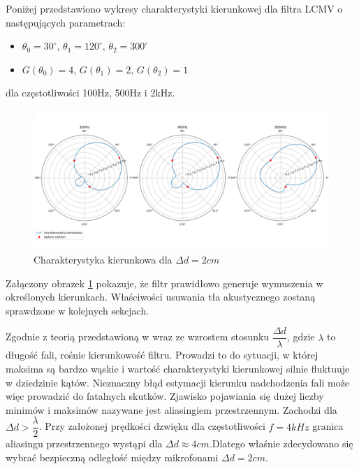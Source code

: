 Poniżej przedstawiono wykresy charakterystyki kierunkowej dla filtra LCMV o następujących parametrach:

\begin{itemize}
    \item $\theta_{0}=30^{\circ}, \,
    \theta_{1}=120^{\circ}, \,
    \theta_{2}=300^{\circ}$
    \item $G(\theta_{0})=4, \,
    G(\theta_{1})=2, \,
    G(\theta_{2})=1$
\end{itemize}
\noindent dla częstotliwości 100Hz, 500Hz i 2kHz.

\begin{figure}[h!]
    \centering
    \includegraphics[width=\textwidth]{Images/directivity0.02m.png}
    \caption{Charakterystyka kierunkowa dla $\Delta d = 2cm$}
    \label{fig:directivity0.02}
\end{figure}

\noindent Załączony obrazek \ref{fig:directivity0.02} pokazuje, że filtr prawidłowo generuje wymuszenia w określonych kierunkach. Właściwości usuwania tła akustycznego zostaną sprawdzone w kolejnych sekcjach.

\noindent Zgodnie z teorią przedstawioną w \cite{mccowan2001} wraz ze wzrostem stosunku $\dfrac{\Delta d}{\lambda}$, gdzie $\lambda$ to długość fali, rośnie kierunkowość filtru. Prowadzi to do sytuacji, w której maksima są bardzo wąskie i wartość charakterystyki kierunkowej silnie fluktuuje w dziedzinie kątów. Nieznaczny błąd estymacji kierunku nadchodzenia fali może więc prowadzić do fatalnych skutków. Zjawisko pojawiania się dużej liczby minimów i maksimów nazywane jest aliasingiem przestrzennym. Zachodzi dla $\Delta d > \dfrac{\lambda}{2}$. Przy założonej prędkości dzwięku dla częstotliwości $f = 4kHz$ granica aliasingu przestrzennego wystąpi dla $\Delta d \approx 4cm $.Dlatego właśnie zdecydowano się wybrać bezpieczną odległość między mikrofonami $\Delta d = 2cm$.

